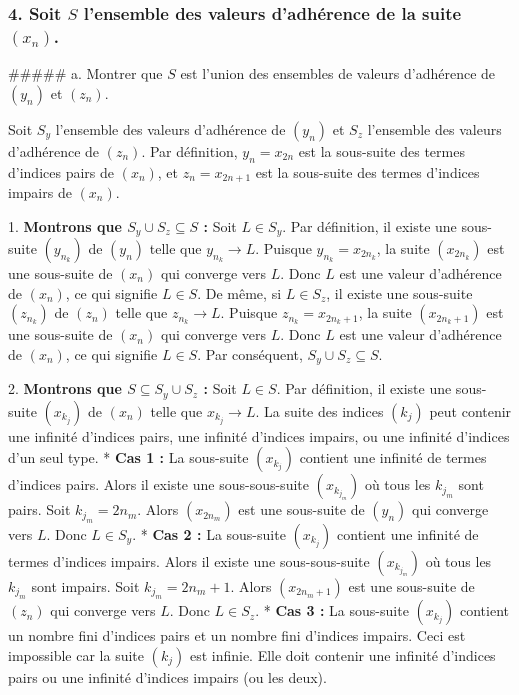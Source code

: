 \documentclass{report}
\begin{document}
\subsubsection*{4. Soit $S$ l'ensemble des valeurs d'adhérence de la suite $(x_n)$.}

##### a. Montrer que $S$ est l'union des ensembles de valeurs d'adhérence de $(y_n)$ et $(z_n)$.

Soit $S_y$ l'ensemble des valeurs d'adhérence de $(y_n)$ et $S_z$ l'ensemble des valeurs d'adhérence de $(z_n)$.
Par définition, $y_n = x_{2n}$ est la sous-suite des termes d'indices pairs de $(x_n)$, et $z_n = x_{2n+1}$ est la sous-suite des termes d'indices impairs de $(x_n)$.

1.  \textbf{Montrons que $S_y \cup S_z \subseteq S$ :}
    Soit $L \in S_y$. Par définition, il existe une sous-suite $(y_{n_k})$ de $(y_n)$ telle que $y_{n_k} \to L$.
    Puisque $y_{n_k} = x_{2n_k}$, la suite $(x_{2n_k})$ est une sous-suite de $(x_n)$ qui converge vers $L$.
    Donc $L$ est une valeur d'adhérence de $(x_n)$, ce qui signifie $L \in S$.
    De même, si $L \in S_z$, il existe une sous-suite $(z_{n_k})$ de $(z_n)$ telle que $z_{n_k} \to L$.
    Puisque $z_{n_k} = x_{2n_k+1}$, la suite $(x_{2n_k+1})$ est une sous-suite de $(x_n)$ qui converge vers $L$.
    Donc $L$ est une valeur d'adhérence de $(x_n)$, ce qui signifie $L \in S$.
    Par conséquent, $S_y \cup S_z \subseteq S$.

2.  \textbf{Montrons que $S \subseteq S_y \cup S_z$ :}
    Soit $L \in S$. Par définition, il existe une sous-suite $(x_{k_j})$ de $(x_n)$ telle que $x_{k_j} \to L$.
    La suite des indices $(k_j)$ peut contenir une infinité d'indices pairs, une infinité d'indices impairs, ou une infinité d'indices d'un seul type.
    *   \textbf{Cas 1 :} La sous-suite $(x_{k_j})$ contient une infinité de termes d'indices pairs.
        Alors il existe une sous-sous-suite $(x_{k_{j_m}})$ où tous les $k_{j_m}$ sont pairs.
        Soit $k_{j_m} = 2n_m$. Alors $(x_{2n_m})$ est une sous-suite de $(y_n)$ qui converge vers $L$.
        Donc $L \in S_y$.
    *   \textbf{Cas 2 :} La sous-suite $(x_{k_j})$ contient une infinité de termes d'indices impairs.
        Alors il existe une sous-sous-suite $(x_{k_{j_m}})$ où tous les $k_{j_m}$ sont impairs.
        Soit $k_{j_m} = 2n_m+1$. Alors $(x_{2n_m+1})$ est une sous-suite de $(z_n)$ qui converge vers $L$.
        Donc $L \in S_z$.
    *   \textbf{Cas 3 :} La sous-suite $(x_{k_j})$ contient un nombre fini d'indices pairs et un nombre fini d'indices impairs.
        Ceci est impossible car la suite $(k_j)$ est infinie. Elle doit contenir une infinité d'indices pairs ou une infinité d'indices impairs (ou les deux).
\end{document}
